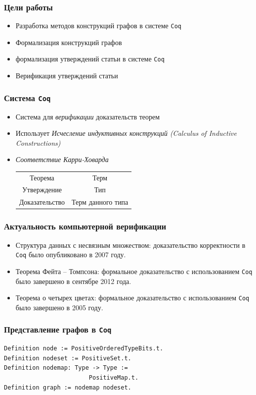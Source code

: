 \documentclass[14pt]{beamer}
\begin{document}
\begin{frame}
\frametitle{Цели работы}
\begin{itemize}
    \item Разработка методов конструкций графов в системе {\tt Coq}
    \item Формализация конструкций графов
    \item формализация утверждений статьи в системе {\tt Coq}
    \item Верификация утверждений статьи
\end{itemize}
\end{frame}

\begin{frame}
\frametitle{Система {\tt Coq}}
\begin{itemize}
    \item Система для {\it верификации} доказательств теорем
    \item Использует {\it Исчесление индуктивных конструкций (Calculus of Inductive Constructions) }
    \item {\it Соответствие Карри-Ховарда }
    \begin{tabular}{cc}
    Теорема & Терм \\
    Утверждение & Тип \\
    Доказательство & Терм данного типа
\end{tabular}
\end{itemize}
\end{frame}

\begin{frame}
\frametitle{Актуальность компьютерной верификации }
\begin{itemize}
    \item Структура данных с несвязным множеством: доказательство корректности в {\tt Coq} было опубликовано в 2007 году.
    \item Теорема Фейта – Томпсона: формальное доказательство с использованием {\tt Coq} было завершено в сентябре 2012 года.
    \item Теорема о четырех цветах: формальное доказательство с использованием {\tt Coq} было завершено в 2005 году.
\end{itemize}
\end{frame}

\begin{frame}[fragile]
\frametitle{Представление графов в {\tt Coq}}

\begin{verbatim}
Definition node := PositiveOrderedTypeBits.t.
Definition nodeset := PositiveSet.t.
Definition nodemap: Type -> Type :=
                        PositiveMap.t.
Definition graph := nodemap nodeset.
\end{verbatim} 

\end{frame}
\end{document}
